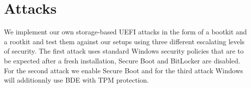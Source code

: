 
\chapter{Attacks}
\label{sec:attacks}

We implement our own storage-based \ac{UEFI} attacks in the form of a bootkit and a rootkit and test them against our setups using three different escalating levels of security.
The first attack uses standard Windows security policies that are to be expected after a fresh installation, Secure Boot and BitLocker are disabled.
For the second attack we enable Secure Boot and for the third attack Windows will additionnly use \ac{BDE} with \ac{TPM} protection.



